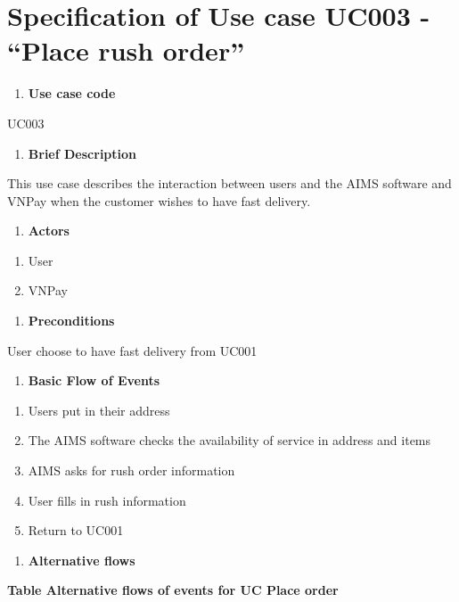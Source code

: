 \documentclass[letterpaper]{report}
\begin{document}
\bigskip


\bigskip


\bigskip

\section[Specification of Use case UC003 {}- “Place rush order”]{Specification of Use case UC003 - “Place rush order”}
\begin{enumerate}
\item \textbf{Use case code}
\end{enumerate}
UC003

\begin{enumerate}
\item \textbf{Brief Description}
\end{enumerate}
This use case describes the interaction between users and the AIMS software and VNPay when the customer wishes to have fast delivery.

\begin{enumerate}
\item \textbf{Actors}
\end{enumerate}
\begin{enumerate}
\item User
\item VNPay
\end{enumerate}
\begin{enumerate}
\item \textbf{Preconditions}
\end{enumerate}
User choose to have fast delivery from UC001

\begin{enumerate}
\item \textbf{Basic Flow of Events}
\end{enumerate}
\begin{enumerate}
\item Users put in their address
\item The AIMS software checks the availability of service in address and items
\item AIMS asks for rush order information
\item User fills in rush information
\item Return to UC001
\end{enumerate}
\begin{enumerate}
\item \textbf{Alternative flows}
\end{enumerate}
{\bfseries
Table Alternative flows of events for UC Place order}
\end{document}
